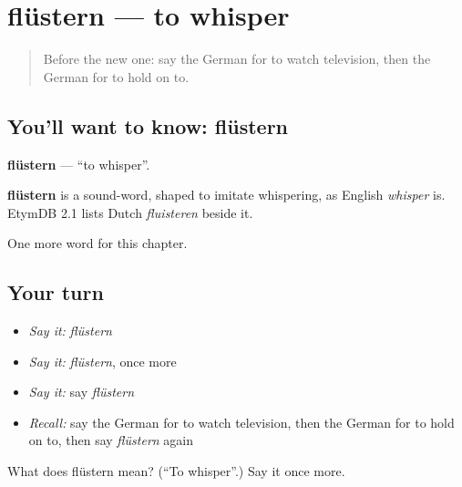 \section[flüstern]{flüstern — to whisper}

\label{lesson:GE-C180-fluestern}



\begin{quote}
Before the new one: say the German for to watch television, then the German for to hold on to.
\end{quote}

\subsection*{You'll want to know: flüstern}
\textbf{flüstern} — \textquotedblleft{}to whisper\textquotedblright{}.

\begin{cousinweb}
\textbf{flüstern} is a sound-word, shaped to imitate whispering, as English \emph{whisper} is. EtymDB 2.1 lists Dutch \emph{fluisteren} beside it.
\end{cousinweb}

\begin{grammarlens}[title={What you've built}]
One more word for this chapter.
\end{grammarlens}

\subsection*{Your turn}
\begin{itemize}
\raggedright
  \item \emph{Say it:} \emph{flüstern}
  \item \emph{Say it:} \emph{flüstern}, once more
  \item \emph{Say it:} say \emph{flüstern}
  \item \emph{Recall:} say the German for to watch television, then the German for to hold on to, then say \emph{flüstern} again
\end{itemize}

\begin{tcolorbox}[breakable,colback=teal!4,colframe=teal!35!black,title={Before you move on}]
What does flüstern mean? (\textquotedblleft{}To whisper\textquotedblright{}.) Say it once more.
\end{tcolorbox}
